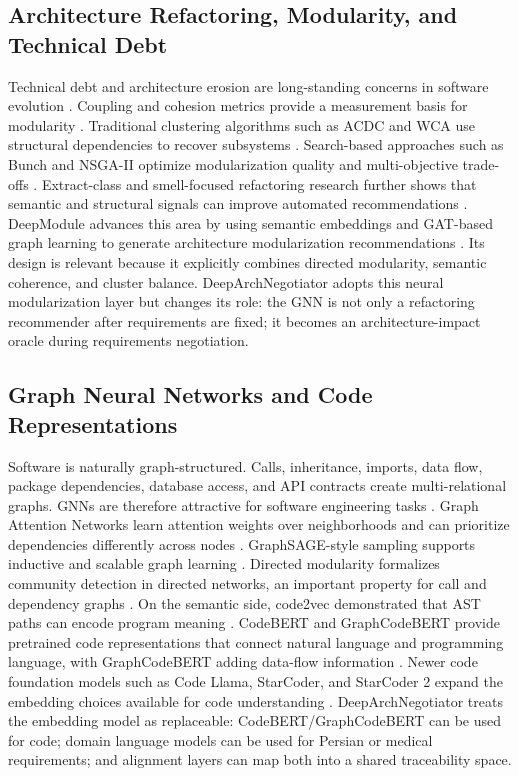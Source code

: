 \documentclass[english,preprint,nonatbib]{elsarticle}
\begin{document}
\subsection{Architecture Refactoring, Modularity, and Technical Debt}

Technical debt and architecture erosion are long-standing concerns in software evolution \cite{cunningham1992debt,lehman1980evolution}.
Coupling and cohesion metrics provide a measurement basis for modularity \cite{briand1999coupling}.
Traditional clustering algorithms such as ACDC and WCA use structural dependencies to recover subsystems \cite{tzerpos2000acdc,maqbool2004wca}.
Search-based approaches such as Bunch and NSGA-II optimize modularization quality and multi-objective trade-offs \cite{mitchell2006bunch,praditwong2011moduleclustering,harman2012sbse}.
Extract-class and smell-focused refactoring research further shows that semantic and structural signals can improve automated recommendations \cite{bavota2014extractclass,abid2020refactoringreview}.
DeepModule advances this area by using semantic embeddings and GAT-based graph learning to generate architecture modularization recommendations \cite{tanhaei2026deepmodule}.
Its design is relevant because it explicitly combines directed modularity, semantic coherence, and cluster balance.
DeepArchNegotiator adopts this neural modularization layer but changes its role: the GNN is not only a refactoring recommender after requirements are fixed;
it becomes an architecture-impact oracle during requirements negotiation.

\subsection{Graph Neural Networks and Code Representations}

Software is naturally graph-structured.
Calls, inheritance, imports, data flow, package dependencies, database access, and API contracts create multi-relational graphs.
GNNs are therefore attractive for software engineering tasks \cite{zhou2020gnnreview}. Graph Attention Networks learn attention weights over neighborhoods and can prioritize dependencies differently across nodes \cite{velickovic2018gat}.
GraphSAGE-style sampling supports inductive and scalable graph learning \cite{hamilton2017graphsage}. Directed modularity formalizes community detection in directed networks, an important property for call and dependency graphs \cite{leicht2008directed}.
On the semantic side, code2vec demonstrated that AST paths can encode program meaning \cite{alon2019code2vec}.
CodeBERT and GraphCodeBERT provide pretrained code representations that connect natural language and programming language, with GraphCodeBERT adding data-flow information \cite{feng2020codebert,guo2020graphcodebert}.
Newer code foundation models such as Code Llama, StarCoder, and StarCoder 2 expand the embedding choices available for code understanding \cite{roziere2023codellama,li2023starcoder,lozhkov2024starcoder2}.
DeepArchNegotiator treats the embedding model as replaceable: CodeBERT/GraphCodeBERT can be used for code;
domain language models can be used for Persian or medical requirements;
and alignment layers can map both into a shared traceability space.
\end{document}
